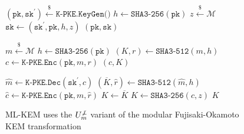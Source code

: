 \documentclass[journal=tches,submission]{iacrtrans}
\newcommand{\pk}{\texttt{pk}}
\newcommand{\sk}{\texttt{sk}}
\newcommand{\leftsample}{\stackrel{\$}{\leftarrow}}
\begin{document}
\begin{figure}[H]
    \centering
    
    \begin{minipage}[t]{0.4\textwidth}
        \begin{algorithm}[H]
            \caption*{$\texttt{ML-KEM.KeyGen()}$}
            \begin{algorithmic}[1]
                \State $(\pk, \sk^\prime) \leftsample \texttt{K-PKE.KeyGen()}$
                \State $h \leftarrow \texttt{SHA3-256}(\pk)$
                \State $z \leftsample \mathcal{M}$
                \State $\sk \leftarrow (\sk^\prime, \pk, h, z)$
                \State \Return $(\pk, \sk)$
            \end{algorithmic}
        \end{algorithm}
        \begin{algorithm}[H]
            \caption*{$\texttt{ML-KEM.Encap}(\pk)$}
            \begin{algorithmic}[1]
                \State $m \leftsample \mathcal{M}$
                \State $h \leftarrow \texttt{SHA3-256}(\pk)$
                \State $(K, r) \leftarrow \texttt{SHA3-512}(m, h)$
                \State $c \leftarrow \texttt{K-PKE.Enc}(\pk, m ,r)$
                \State \Return $(c, K)$
            \end{algorithmic}
        \end{algorithm}
    \end{minipage}
    \begin{minipage}[t]{0.4\textwidth}
        \begin{algorithm}[H]
            \caption*{$\texttt{ML-KEM.Decap}(\sk, c)$}
            \begin{algorithmic}[1]
                \State $\hat{m} \leftarrow \texttt{K-PKE.Dec}(\sk^\prime, c)$
                \State $(\overline{K}, \hat{r}) \leftarrow \texttt{SHA3-512}(\hat{m}, h)$
                \State $\hat{c} \leftarrow \texttt{K-PKE.Enc}(\pk, m, \hat{r})$
                    \State $K \leftarrow \overline{K}$
                \Else 
                    \State $K \leftarrow \texttt{SHA3-256}(c, z)$
                \EndIf
                \State \Return $K$
            \end{algorithmic}
        \end{algorithm}
    \end{minipage}

    \caption{ML-KEM uses the $U^{\not\bot}_m$ variant of the modular Fujisaki-Okamoto KEM transformation}\label{fig:ml-kem-routines}
\end{figure}
\end{document}
